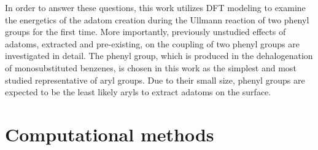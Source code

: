 \documentclass[%
 reprint,
 amsmath,amssymb,
 aps,
prb,
floatfix,
]{revtex4-2}
\newcommand{\lock}{\color{red}}
\newcommand{\lock}{\color{black}}
\begin{document}
\fi

{\lock

In order to answer these questions, this work utilizes DFT modeling to examine the energetics of the adatom creation during the Ullmann reaction of two phenyl groups for the first time. 
More importantly, previously unstudied effects of adatoms, extracted and pre-existing, on the coupling of two phenyl groups are investigated in detail. 
The phenyl group, which is produced in the dehalogenation of monosubstituted benzenes, is chosen in this work as the simplest and most studied representative of aryl groups. Due to their small size, phenyl groups are expected to be the least likely aryls to extract adatoms on the surface.




}

\section{Computational methods}
\end{document}
